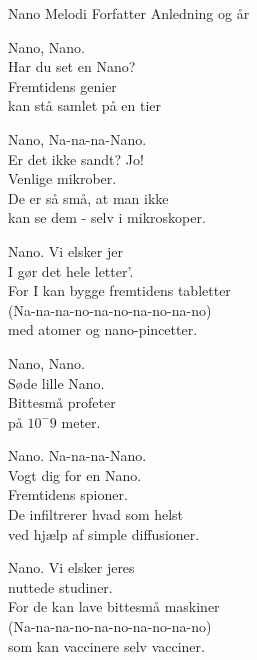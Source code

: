 \begin{song}{Nano}
  {} %
  {Melodi} %
  {Forfatter} %
  {Anledning og år} %
  {\NotCCLIed} %

  \begin{SBVerse}
Nano, Nano.\\
Har du set en Nano?\\
Fremtidens genier\\
kan stå samlet på en tier
  \end{SBVerse}

  \begin{SBVerse}
Nano, Na-na-na-Nano.\\
Er det ikke sandt? Jo!\\
Venlige mikrober.\\
De er så små, at man ikke\\
kan se dem - selv i mikroskoper.
  \end{SBVerse}

  \begin{SBChorus}
Nano. Vi elsker jer\\
I gør det hele letter’.\\
For I kan bygge fremtidens tabletter\\
(Na-na-na-no-na-no-na-no-na-no)\\
med atomer og nano-pincetter.
  \end{SBChorus}

  \begin{SBVerse}
Nano, Nano.\\
Søde lille Nano.\\
Bittesmå profeter\\
på $10^-9$ meter.
  \end{SBVerse}

  \begin{SBVerse}
Nano. Na-na-na-Nano.\\
Vogt dig for en Nano.\\
Fremtidens spioner.\\
De infiltrerer hvad som helst\\
ved hjælp af simple diffusioner.
  \end{SBVerse}

  \begin{SBChorus}
Nano. Vi elsker jeres\\
nuttede studiner.\\
For de kan lave bittesmå maskiner\\
(Na-na-na-no-na-no-na-no-na-no)\\
som kan vaccinere selv vacciner.
  \end{SBChorus}


\end{song}
